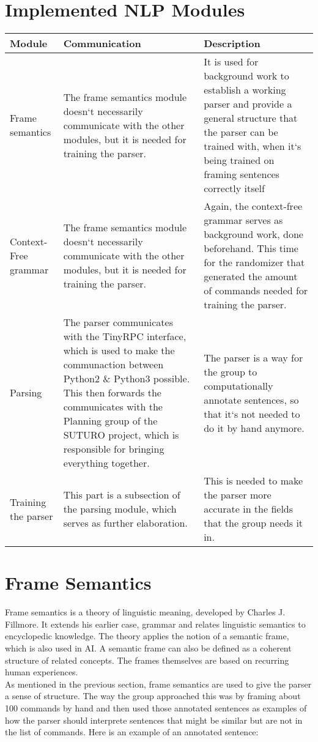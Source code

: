 \documentclass[main.tex]{subfiles}
\begin{document}
	 \section{Implemented NLP Modules}
	 	
	 	\begin{tabular}{ | p{3cm} | p{5cm} | p{5cm} | } 
	 		\hline 
	 		\textbf{Module} & \textbf{Communication} & \textbf{Description} \\ 
	 		\hline 
	 		Frame semantics & The frame semantics  module doesn‘t necessarily communicate with the other modules, but it is needed for training the parser. & It is used for background work to establish a working parser and provide a general structure that the parser can be trained with, when it‘s being trained on framing sentences correctly itself \\ 
	 		\hline 
	 		Context-Free grammar & The frame semantics  module doesn‘t necessarily communicate with the other modules, but it is needed for training the parser. & Again, the context-free grammar serves as background work, done beforehand. This time for the randomizer that generated the amount of commands needed for training the parser. \\
	 		\hline 
	 		Parsing & The parser communicates with the TinyRPC interface, which is used to make the communaction between Python2 \& Python3 possible. This then forwards the communicates with the Planning group of the SUTURO project, which is responsible for bringing everything together. & The parser is a way for the group to computationally annotate sentences, so that it‘s not needed to do it by hand anymore.\\
	 		\hline 
	 		Training the parser & This part is a subsection of the parsing module, which serves as further elaboration. & This is needed to make the parser more accurate in the fields that the group needs it in.\\
	 		\hline 
	 	\end{tabular} 

	
	\section{Frame Semantics}
	Frame semantics is a theory of linguistic meaning, developed by Charles J. Fillmore. It extends his earlier case, grammar and relates linguistic semantics to encyclopedic knowledge. The theory applies the notion of a semantic frame, which is also used in AI. A semantic frame can also be defined as a coherent structure of related concepts. The frames themselves are based on recurring human experiences.\\
	As mentioned in the previous section, frame semantics are used to give the parser a sense of structure. The way the group approached this was by framing about 100 commands by hand and then used those annotated sentences as examples of how the parser should interprete sentences that might be similar but are not in the list of commands. 
	Here is an example of an annotated sentence: 
\end{document}
